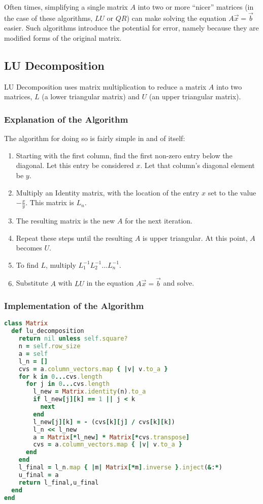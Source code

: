 \documentclass[letterpaper,12pt]{article}
\begin{document}
Often times, simplifying a single matrix $A$ into two or more ``nicer'' matrices
(in the case of these algorithms, $LU$ or $QR$) can make solving the equation
$A\vec{x}=\vec{b}$ easier.
Such algorithms introduce the potential for error, namely because they are
modified forms of the original matrix.

\subsection{LU Decomposition}

LU Decomposition uses matrix multiplication to reduce a matrix $A$ into two
matrices, $L$ (a lower triangular matrix) and $U$ (an upper triangular matrix).

\subsubsection{Explanation of the Algorithm}

The algorithm for doing so is fairly simple in and of itself:

\begin{enumerate}
\item Starting with the first column, find the first non-zero entry below the
  diagonal. Let this entry be considered $x$. Let that column's diagonal element
  be $y$.
\item Multiply an Identity matrix, with the location of the entry $x$ set to the
  value $-\frac{x}{y}$. This matrix is $L_n$.
\item The resulting matrix is the new $A$ for the next iteration.
\item Repeat these steps until the resulting $A$ is upper triangular.
  At this point, $A$ becomes $U$.
\item To find $L$, multiply $L_1^{-1}L_2^{-1} ... L_n^{-1}$.
\item Substitute $A$ with $LU$ in the equation $A\vec{x}=\vec{b}$ and solve.
\end{enumerate}

\subsubsection{Implementation of the Algorithm}

\lstset{caption=LU Decomposition}
\begin{lstlisting}[language=ruby]
class Matrix
  def lu_decomposition
    return nil unless self.square?
    n = self.row_size
    a = self
    l_n = []
    cvs = a.column_vectors.map { |v| v.to_a }
    for k in 0...cvs.length
      for j in 0...cvs.length
        l_new = Matrix.identity(n).to_a
        if l_new[j][k] == 1 || j < k
          next
        end
        l_new[j][k] = - (cvs[k][j] / cvs[k][k])
        l_n << l_new
        a = Matrix[*l_new] * Matrix[*cvs.transpose]
        cvs = a.column_vectors.map { |v| v.to_a }
      end
    end
    l_final = l_n.map { |m| Matrix[*m].inverse }.inject(&:*)
    u_final = a
    return l_final,u_final
  end
end
\end{lstlisting}
\end{document}
